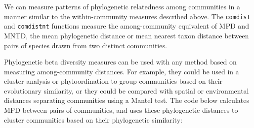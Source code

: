 \documentclass[12pt]{article}
\begin{document}
We can measure patterns of phylogenetic relatedness among communities in a manner similar to the within-community measures described above. The \texttt{comdist} and \texttt{comdistnt} functions measure the among-community equivalent of MPD and MNTD, the mean phylogenetic distance or mean nearest taxon distance between pairs of species drawn from two distinct communities.

Phylogenetic beta diversity measures can be used with any method based on measuring among-community distances. For example, they could be used in a cluster analysis or phyloordination to group communities based on their evolutionary similarity, or they could be compared with spatial or environmental distances separating communities using a Mantel test. The code below calculates MPD between pairs of communities, and uses these phylogenetic distances to cluster communities based on their phylogenetic similarity:
\end{document}
